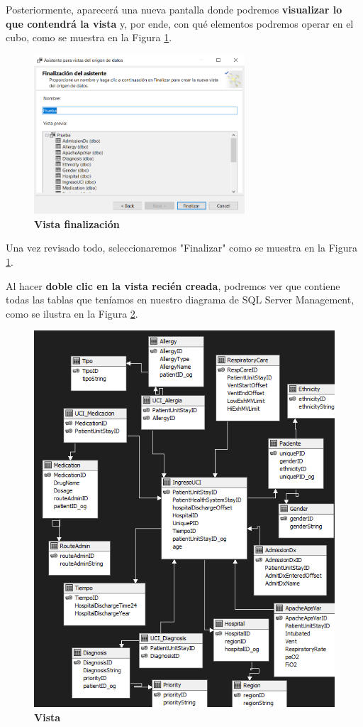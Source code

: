 \documentclass[12pt, a4paper, twoside]{article}
\begin{document}
Posteriormente, aparecerá una nueva pantalla donde podremos \textbf{visualizar lo que contendrá la vista} y, por ende, con qué elementos podremos operar en el cubo, como se muestra en la Figura \ref{fig:6}.

\begin{figure}[H]
	\centering
	\includegraphics[width=0.7\textwidth]{image/asistenteVista}
	\caption{\textbf{Vista finalización}}
	\label{fig:6}
\end{figure}

Una vez revisado todo, seleccionaremos "Finalizar" como se muestra en la Figura \ref{fig:6}.

Al hacer \textbf{doble clic en la vista recién creada}, podremos ver que contiene todas las tablas que teníamos en nuestro diagrama de SQL Server Management, como se ilustra en la Figura \ref{fig:7}.

\begin{figure}[H]
	\centering
	\includegraphics[width=1\textwidth]{image/vista_origenes_datos}
	\caption{\textbf{Vista}}
	\label{fig:7}
\end{figure}
\end{document}
